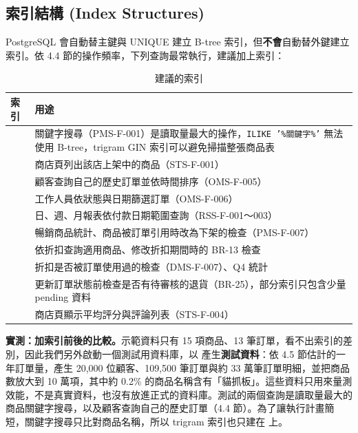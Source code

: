 \subsection{索引結構 (Index Structures)}

PostgreSQL 會自動替主鍵與 UNIQUE 建立 B-tree 索引，但\textbf{不會}自動替外鍵建立索引。依 4.4 節的操作頻率，下列查詢最常執行，建議加上索引：

\begingroup\small
\begin{xltabular}{\linewidth}{|>{\raggedright\arraybackslash}p{5.6cm}|>{\raggedright\arraybackslash}X|}
\caption{建議的索引}\\
\hline{}\textbf{索引} & \textbf{用途}\\\hline\endhead
{}  & 關鍵字搜尋（PMS-F-001）是讀取量最大的操作，\texttt{ILIKE '\%關鍵字\%'} 無法使用 B-tree，trigram GIN 索引可以避免掃描整張商品表\\\hline
{} & 商店頁列出該店上架中的商品（STS-F-001）\\\hline
{} & 顧客查詢自己的歷史訂單並依時間排序（OMS-F-005）\\\hline
{} & 工作人員依狀態與日期篩選訂單（OMS-F-006）\\\hline
{} & 日、週、月報表依付款日期範圍查詢（RSS-F-001～003）\\\hline
{} & 暢銷商品統計、商品被訂單引用時改為下架的檢查（PMS-F-007）\\\hline
{} & 依折扣查詢適用商品、修改折扣期間時的 BR-13 檢查\\\hline
{} & 折扣是否被訂單使用過的檢查（DMS-F-007）、Q4 統計\\\hline
{} & 更新訂單狀態前檢查是否有待審核的退貨（BR-25），部分索引只包含少量 pending 資料\\\hline
{} & 商店頁顯示平均評分與評論列表（STS-F-004）\\\hline
\end{xltabular}
\endgroup

\textbf{實測：加索引前後的比較。}示範資料只有 15 項商品、13 筆訂單，看不出索引的差別，因此我們另外啟動一個測試用資料庫，以  產生\textbf{測試資料}：依 4.5 節估計的一年訂單量，產生 20,000 位顧客、109,500 筆訂單與約 33 萬筆訂單明細，並把商品數放大到 10 萬項，其中約 0.2\% 的商品名稱含有「貓抓板」。這些資料只用來量測效能，不是真實資料，也沒有放進正式的資料庫。測試的兩個查詢是讀取量最大的商品關鍵字搜尋，以及顧客查詢自己的歷史訂單（4.4 節）。為了讓執行計畫簡短，關鍵字搜尋只比對商品名稱，所以 trigram 索引也只建在  上。

